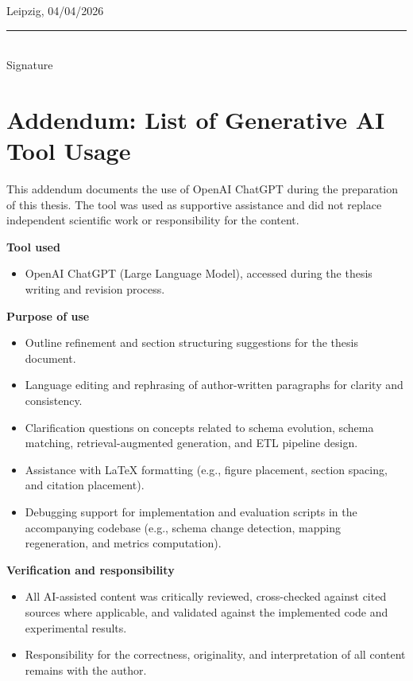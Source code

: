 \vspace{1.5em}
\noindent Leipzig, 04/04/2026

\vspace{3em}
\noindent\rule{0.45\textwidth}{0.4pt}\\
\noindent Signature

\newpage

\section*{Addendum: List of Generative AI Tool Usage}
\noindent This addendum documents the use of OpenAI ChatGPT during the preparation of this thesis. The tool was used as supportive assistance and did not replace independent scientific work or responsibility for the content.

\vspace{0.5em}
\noindent \textbf{Tool used}
\begin{itemize}
  \item OpenAI ChatGPT (Large Language Model), accessed during the thesis writing and revision process.
\end{itemize}

\noindent \textbf{Purpose of use}
\begin{itemize}
  \item Outline refinement and section structuring suggestions for the thesis document.
  \item Language editing and rephrasing of author-written paragraphs for clarity and consistency.
  \item Clarification questions on concepts related to schema evolution, schema matching, retrieval-augmented generation, and ETL pipeline design.
  \item Assistance with LaTeX formatting (e.g., figure placement, section spacing, and citation placement).
  \item Debugging support for implementation and evaluation scripts in the accompanying codebase (e.g., schema change detection, mapping regeneration, and metrics computation).
\end{itemize}

\noindent \textbf{Verification and responsibility}
\begin{itemize}
  \item All AI-assisted content was critically reviewed, cross-checked against cited sources where applicable, and validated against the implemented code and experimental results.
  \item Responsibility for the correctness, originality, and interpretation of all content remains with the author.
\end{itemize}
